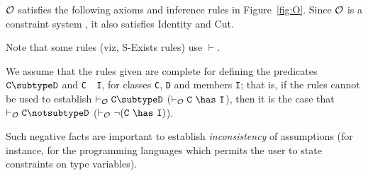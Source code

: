 $\cal O$ satisfies the following axioms and inference rules in
Figure~\ref{fig:O}. Since $\cal O$ is a constraint system \cite{cccc},
it also satisfies Identity and Cut.

Note that some rules (viz, {\sc S-Exists} rules)
use $\vdash$. 

We assume that the rules given are complete for
defining the predicates $\tt C \subtype D$ and {\tt C\ \has\ I}, for
classes {\tt C}, {\tt D} and members {\tt I}; that is, if the rules
cannot be used to establish $\tt \vdash_{\cal O} C \subtype D$ ($\tt
\vdash_{\cal O} C\ \has\ I$), then it is the case that $\tt
\vdash_{\cal O} C \notsubtype D$ ($\tt \vdash_{\cal O} \neg (C\ \has\
I)$).

Such negative facts are important to establish {\em inconsistency} of
assumptions (for instance, for the programming languages which permits
the user to state constraints on type variables).  

